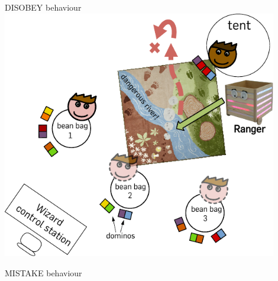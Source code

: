 \documentclass[compress]{beamer}
\begin{document}
\begin{frame}{DISOBEY behaviour}
        \centering
        \includegraphics[width=0.9\textwidth]{domino-setup-disobey}
\end{frame}

\begin{frame}{MISTAKE behaviour}

    \centering
     {
    }
\end{frame}
\end{document}
